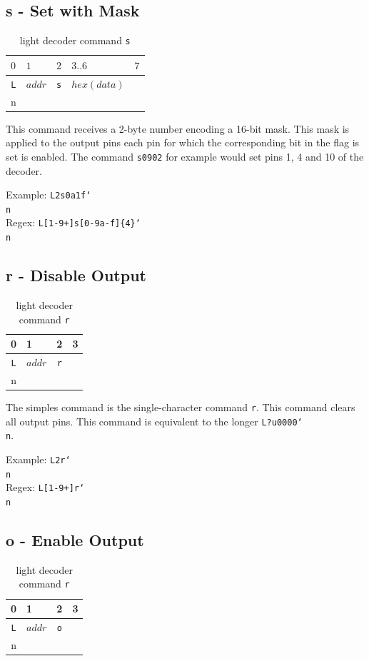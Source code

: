 \documentclass{scrreprt}
\newcommand\n{\char`\\n}
\begin{document}
\pagebreak
\subsection{s - Set with Mask}
\begin{table}[ht!]
\centering
\begin{tabular}{ |c|c||c|c||c| } 
\multicolumn{1}{l}{$0$} & \multicolumn{1}{l}{$1$} & \multicolumn{1}{l}{$2$} & \multicolumn{1}{l}{$3..6$} & \multicolumn{1}{l}{$7$} \\ \hline
\texttt{L} & $addr$ & \texttt{s} & $hex(data)$ & \texttt{\n} \\\hline
\end{tabular}
\caption{light decoder command \texttt{s}}
\end{table}

This command receives a 2-byte number encoding a 16-bit mask.
This mask is applied to the output pins each pin for which the corresponding bit in the flag is set is enabled. The command \texttt{s0902} for example would set pins 1, 4 and 10 of the decoder.

Example: \texttt{L2s0a1f\n} \\
Regex: \texttt{L[1-9+]s[0-9a-f]\{4\}\n}

\subsection{r - Disable Output}
\begin{table}[ht!]
\centering
\begin{tabular}{ |c|c||c||c| } 
\multicolumn{1}{l}{0} & \multicolumn{1}{l}{1} & \multicolumn{1}{l}{2} & \multicolumn{1}{l}{3} \\ \hline
\texttt{L} & $addr$ & \texttt{r} & \texttt{\n} \\\hline
\end{tabular}
\caption{light decoder command \texttt{r}}
\end{table}

The simples command is the single-character command \texttt{r}.
This command clears all output pins.
This command is equivalent to the longer \texttt{L?u0000\n}.

Example: \texttt{L2r\n}\\
Regex: \texttt{L[1-9+]r\n}

\subsection{o - Enable Output}
\begin{table}[ht!]
\centering
\begin{tabular}{ |c|c||c||c| } 
\multicolumn{1}{l}{0} & \multicolumn{1}{l}{1} & \multicolumn{1}{l}{2} & \multicolumn{1}{l}{3} \\ \hline
\texttt{L} & $addr$ & \texttt{o} & \texttt{\n} \\\hline
\end{tabular}
\caption{light decoder command \texttt{r}}
\end{table}
\end{document}
